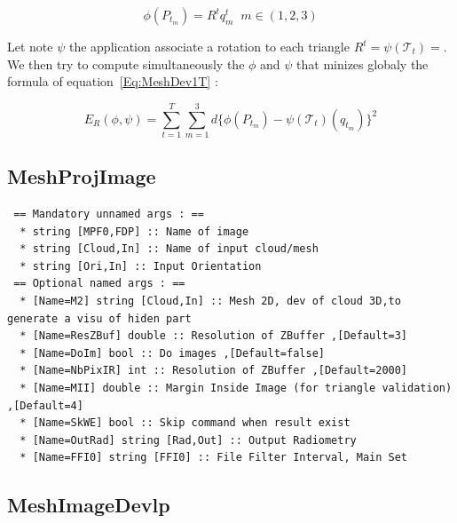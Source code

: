 \begin{equation}
	\phi(P_{t_m}) =  R^t q^t_m  \;\; m \in (1,2,3) \label{Eq:MeshDev1T}
\end{equation}


Let note $\psi$ the application associate a rotation to each triangle $R^t = \psi(\mathcal{T}_t)=$.
We then try to compute simultaneously the $\phi$ and $\psi$ that minizes globaly the 
formula of equation~\ref{Eq:MeshDev1T} :

\begin{equation}
    E_R(\phi,\psi)= \sum_{t=1}^T \sum_{m=1}^3  d\{\phi(P_{t_m}) - \psi(\mathcal{T}_t)(q_{t_m})\} ^2
\end{equation}


\subsection{MeshProjImage}

\begin{verbatim}
 == Mandatory unnamed args : ==
  * string [MPF0,FDP] :: Name of image
  * string [Cloud,In] :: Name of input cloud/mesh
  * string [Ori,In] :: Input Orientation
 == Optional named args : ==
  * [Name=M2] string [Cloud,In] :: Mesh 2D, dev of cloud 3D,to generate a visu of hiden part 
  * [Name=ResZBuf] double :: Resolution of ZBuffer ,[Default=3]
  * [Name=DoIm] bool :: Do images ,[Default=false]
  * [Name=NbPixIR] int :: Resolution of ZBuffer ,[Default=2000]
  * [Name=MII] double :: Margin Inside Image (for triangle validation) ,[Default=4]
  * [Name=SkWE] bool :: Skip command when result exist
  * [Name=OutRad] string [Rad,Out] :: Output Radiometry 
  * [Name=FFI0] string [FFI0] :: File Filter Interval, Main Set
\end{verbatim}


\subsection{MeshImageDevlp}





